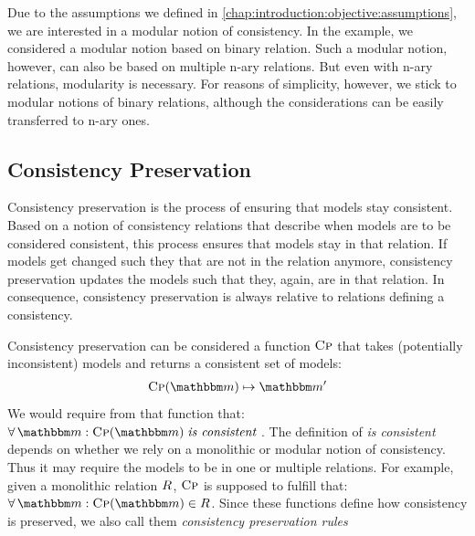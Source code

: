 Due to the assumptions we defined in \autoref{chap:introduction:objective:assumptions}, we are interested in a modular notion of consistency.
In the example, we considered a modular notion based on binary relation. Such a modular notion, however, can also be based on multiple n-ary relations. 
But even with n-ary relations, modularity is necessary.
For reasons of simplicity, however, we stick to modular notions of binary relations, although the considerations can be easily transferred to n-ary ones.


\subsection{Consistency Preservation}

Consistency preservation is the process of ensuring that models stay consistent.
Based on a notion of \glspl{consistency relation} that describe when models are to be considered consistent, this process ensures that models stay in that relation. 
If models get changed such they that are not in the relation anymore, consistency preservation updates the models such that they, again, are in that relation.
In consequence, consistency preservation is always relative to relations defining a consistency.

Consistency preservation can be considered a function $\textsc{Cp}$ that takes (potentially inconsistent) models and returns a consistent set of models:
\begin{align*}
    \function{Cp}(\modelset{m}) \mapsto \modelset{m'}
\end{align*}
We would require from that function that: $\forall \modelset{m} : \function{Cp}(\modelset{m}) \mathtext{is consistent}$.
The definition of \emph{is consistent} depends on whether we rely on a monolithic or modular notion of consistency.
Thus it may require the models to be in one or multiple relations.
For example, given a monolithic relation $R_{}$, $\textsc{Cp}$ is supposed to fulfill that: $\forall \modelset{m} : \function{Cp}(\modelset{m}) \in \consistencyrelation{R}{}$.
Since these functions define how consistency is preserved, we also call them \emph{\glspl{consistency preservation rule}}

